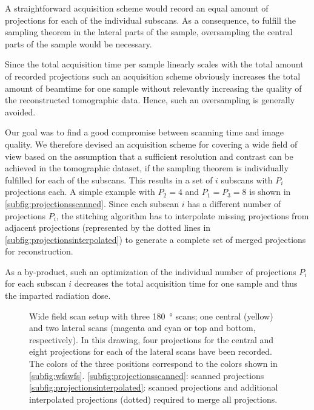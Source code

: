 A straightforward acquisition scheme would record an equal amount of projections for each of the individual subscans. As a consequence, to fulfill the sampling theorem in the lateral parts of the sample, oversampling the central parts of the sample would be necessary.

Since the total acquisition time per sample linearly scales with the total amount of recorded projections such an acquisition scheme obviously increases the total amount of beamtime for one sample without relevantly increasing the quality of the reconstructed tomographic data. Hence, such an oversampling is generally avoided.

Our goal was to find a good compromise between scanning time and image quality. We therefore devised an acquisition scheme for covering a wide field of view based on the assumption that a sufficient resolution and contrast can be achieved in the tomographic dataset, if the sampling theorem is individually fulfilled for each of the subscans. This results in a set of $i$ subscans with $P_{i}$ projections each. A simple example with $P_{2}=4$ and $P_{1}=P_{3}=8$ is shown in \autoref{subfig:projectionsscanned}. Since each subscan $i$ has a different number of projections $P_{i}$, the stitching algorithm has to interpolate missing projections from adjacent projections (represented by the dotted lines in \autoref{subfig:projectionsinterpolated}) to generate a complete set of merged projections for reconstruction.

As a by-product, such an optimization of the individual number of projections $P_{i}$ for each subscan $i$ decreases the total acquisition time for one sample and thus the imparted radiation dose.

\begin{figure}[htb]%
	\centering
	\noindent{}%
	\caption[Wide field scan setup]{Wide field scan setup with three \SI{180}{\degree} scans; one central (yellow) and two lateral scans (magenta and cyan or top and bottom, respectively). In this drawing, four projections for the central and eight projections for each of the lateral scans have been recorded. The colors of the three positions correspond to the colors shown in \autoref{subfig:wfswfs}. %
	\ref{subfig:projectionsscanned}: scanned projections %
	\ref{subfig:projectionsinterpolated}: scanned projections and additional interpolated projections (dotted) required to merge all projections.}
	\label{fig:projections}
\end{figure}%

